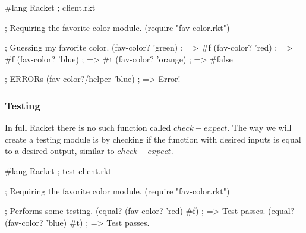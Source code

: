 \begin{code}[Lisp]
#lang Racket ; client.rkt

; Requiring the favorite color module.
(require "fav-color.rkt")

; Guessing my favorite color.
(fav-color? 'green) ; => #f
(fav-color? 'red) ; => #f
(fav-color? 'blue) ; => #t
(fav-color? 'orange) ; => #false

; ERRORs
(fav-color?/helper 'blue) ; => Error!
\end{code}

\subsubsection*{Testing}

In full Racket there is no such function called $check-expect$. The way we will create a testing module is by checking if the function with desired inputs is equal to a desired output, similar to $check-expect$.\\


\begin{code}[Lisp]
#lang Racket ; test-client.rkt

; Requiring the favorite color module.
(require "fav-color.rkt")

; Performs some testing.
(equal? (fav-color? 'red) #f) ; => Test passes.
(equal? (fav-color? 'blue) #t) ; => Test passes.
\end{code}